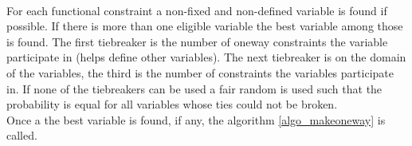 \DecMargin{1em} \\
For each functional constraint a non-fixed and non-defined variable is found if possible. If there is more than one 
eligible variable the best variable among those is found. The first tiebreaker is the number of oneway constraints the 
variable participate in (helps define other variables). The next tiebreaker is on the domain of the variables, the 
third is the number of constraints the variables participate in. If none of the tiebreakers can be used a fair random 
is used such that the probability is equal for all variables whose ties could not be broken. \\ 
Once a the best variable is found, if any, the algorithm \ref{algo_makeoneway}  \makeOneway is called.







